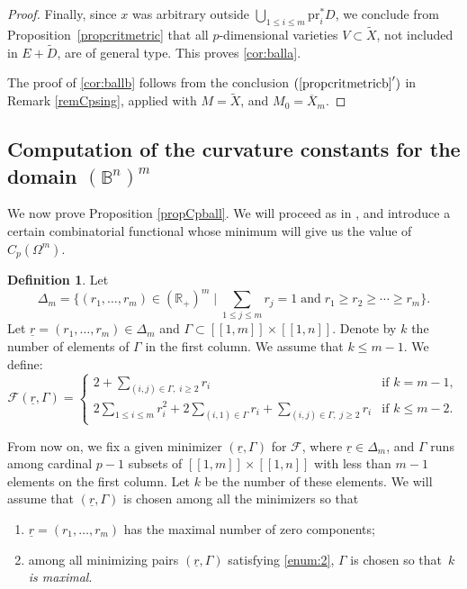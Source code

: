 \documentclass[JEP,XML,SOM,Unicode, NoEqCountersInSection,NoFloatCountersInSection,published]{cedram}
\let\mathcal\mathscr
\newcommand{\llbracket}{[\![}
\newcommand{\rrbracket}{]\!]}
\let\ts\textstyle
\newcommand{\pr}{\mathrm{pr}}
\theoremstyle{theorem}
\theoremstyle{definition}
\newtheorem{definition}[proposition]{Definition}
\begin{document}
\begin{proof}
Finally, since $x$ was arbitrary outside $\bigcup_{1 \leq i \leq m} \pr_i^\ast D$, we conclude from Proposition~\ref{propcritmetric} that all $p$-dimensional varieties $V \subset \widetilde{X}$, not included in $E + \widetilde{D}$, are of general type. This proves \eqref{cor:balla}.

The proof of \eqref{cor:ballb} follows from the conclusion $(\ref{propcritmetricb}')$ in Remark \ref{remCpsing}, applied with $M = \widetilde{X}$, and $M_0 = \overline{X}_m$.
\end{proof}

\subsection{Computation of the curvature constants for the domain $(\mathbb B^n)^m$} \label{sectconstantsball}

We now prove Proposition \ref{propCpball}. We will proceed as in \cite{cad18}, and introduce a certain combinatorial functional whose minimum will give us the value of $C_p (\Omega^m)$.

\begin{definition} \label{defiF} Let
\[\ts
\Delta_m = \{ (r_1,\dots, r_m) \in (\mathbb R_+)^m \mid \sum_{1 \leq j \leq m} r_j = 1 \; \text{and}\; r_1 \geq r_2 \geq \cdots \geq r_m \}.
\]
Let $\underline{r} = (r_1,\dots, r_m) \in \Delta_m$ and $\Gamma \subset \llbracket 1, m \rrbracket \times \llbracket 1, n \rrbracket$. Denote by $k$ the number of elements of $\Gamma$ in the first column. We assume that $k \leq m - 1$. We define:
\[
\mathcal F(\underline{r}, \Gamma) = 
\begin{cases}
2 + \sum_{(i, j) \in \Gamma,\; i \geq 2} r_i &\text{if } k = m - 1,\\[5pt]
2 \sum_{1 \leq i \leq m} r_i^2 + 2 \sum_{(i, 1) \in \Gamma} r_i + \sum_{(i, j) \in \Gamma, \; j \geq 2} r_i &\text{if } k \leq m - 2.
\end{cases}
\]
\end{definition}

From now on, we fix a given minimizer $(\underline{r}, \Gamma)$ for $\mathcal F$, where $\underline{r} \in \Delta_m$, and $\Gamma$ runs among cardinal $p - 1$ subsets of $\llbracket 1, m \rrbracket \times \llbracket 1, n \rrbracket$ with less than $m-1$ elements on the first column. Let $k$ be the number of these elements. We will assume that $(\underline{r}, \Gamma)$ is chosen among all the minimizers so that
\begin{enumerate}
\item\label{enum:1} $\underline{r} = (r_1,\dots, r_m)$ has the maximal number of zero components;
\item\label{enum:2} among all minimizing pairs $(\underline{r}, \Gamma)$ satisfying \eqref{enum:2}, $\Gamma$ is chosen so that~\emph{$k$ is maximal}.
\end{enumerate}
\end{document}
